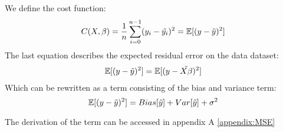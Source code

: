 
We define the cost function:\\
\begin{equation}
C(X,\beta)= \frac{1}{n}\sum_{i=0}^{n-1}(y_i-\Tilde{y_i})^2=\mathbb{E}[(y-\Tilde{y})^2]
\end{equation}
The last equation describes the expected residual error on the data dataset: 
\begin{align*}
    \mathbb{E}[(y-\Tilde{y})^2] = \mathbb{E}[(y-\Tilde{X\beta})^2]
\end{align*}
Which can be rewritten as a term consisting of the bias and variance term:
\begin{equation}
    \mathbb{E}[(y-\Tilde{y})^2] = Bias[\Tilde{y}]+Var[\Tilde{y}]+\sigma^2
\end{equation}

The derivation of the term can be accessed in appendix A \ref{appendix:MSE}


